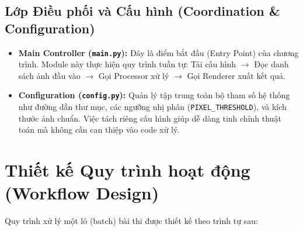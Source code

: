 \documentclass[6pt, a4paper]{report}
\begin{document}
	\subsection{Lớp Điều phối và Cấu hình (Coordination \& Configuration)}
	\begin{itemize}
		\item \textbf{Main Controller (\texttt{main.py}):} Đây là điểm bắt đầu (Entry Point) của chương trình. Module này thực hiện quy trình tuần tự: Tải cấu hình $\rightarrow$ Đọc danh sách ảnh đầu vào $\rightarrow$ Gọi Processor xử lý $\rightarrow$ Gọi Renderer xuất kết quả.
		\item \textbf{Configuration (\texttt{config.py}):} Quản lý tập trung toàn bộ tham số hệ thống như đường dẫn thư mục, các ngưỡng nhị phân (\texttt{PIXEL\_THRESHOLD}), và kích thước ảnh chuẩn. Việc tách riêng cấu hình giúp dễ dàng tinh chỉnh thuật toán mà không cần can thiệp vào code xử lý.
	\end{itemize}
	
	\section{Thiết kế Quy trình hoạt động (Workflow Design)}
	
	Quy trình xử lý một lô (batch) bài thi được thiết kế theo trình tự sau:
	
\end{document}
